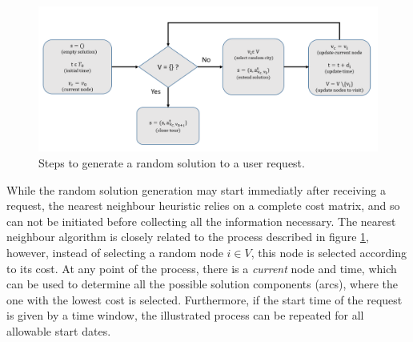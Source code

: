\begin{figure}[htpb]
  \centering
  \includegraphics[width=\textwidth]{Figures/system_implementation/random_solution.png}
  \caption{Steps to generate a random solution to a user request.}
  \label{fig:random_solution}  
\end{figure}

While the random solution generation may start immediatly after receiving a request,
the nearest neighbour heuristic relies on a complete cost matrix,
and so can not be initiated before collecting all the information necessary.
The nearest neighbour algorithm is closely related to the process described in figure \ref{fig:random_solution},
however, instead of selecting a random node $i \in V$,
this node is selected according to its cost. At any point of the process, there is a \textit{current} node and time,
which can be used to determine all the possible solution components (arcs), where the one with the lowest cost is selected.
Furthermore, if the start time of the request is given by a time window,
the illustrated process can be repeated for all allowable start dates.






